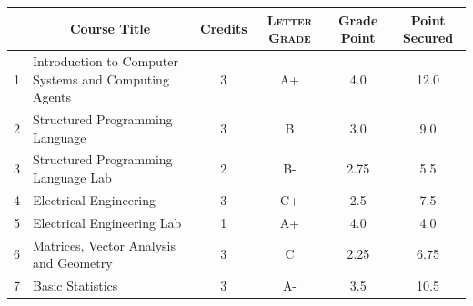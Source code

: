 \documentclass[11pt]{article}
\newcommand*{\numtwo}[1]{\pgfmathprintnumber[
                    fixed, precision=2, fixed zerofill=true]{#1}}
\begin{document}
                \begin{center}
                    \renewcommand{\arraystretch}{1.08}
                    
                \begin{tabular}{|c|l|c|>{\scshape}c|c|c|}
                \hline  \rule[-1ex]{0pt}{3.5ex} {\centering{\bf Course Code}} &  \multicolumn{1}{c|}{\textbf{Course Title}}  & {\bf Credits} & {\bf Letter Grade} & {\bf Grade Point} & {\bf Point Secured}  \\ 
                \hline   1 &  Introduction to Computer Systems and Computing Agents		 & 3 & A+ & 4.0 & 12.0 \\ %
                \hline   2 &  Structured Programming Language		 & 3 & B & 3.0 & 9.0 \\ %
                \hline   3 &  Structured Programming Language Lab		 & 2 & B- & 2.75 & 5.5 \\ %
                \hline   4 &  Electrical Engineering		 & 3 & C+ & 2.5 & 7.5 \\ %
                \hline   5 &  Electrical Engineering Lab		 & 1 & A+ & 4.0 & 4.0 \\ %
                \hline   6 &  Matrices, Vector Analysis and Geometry		 & 3 & C & 2.25 & 6.75 \\ %
                \hline   7 &  Basic Statistics		 & 3 & A- & 3.5 & 10.5 \\ %

\hline                %
                \end{tabular}
                \end{center}
                \renewcommand{\arraystretch}{1.03}
\end{document}
